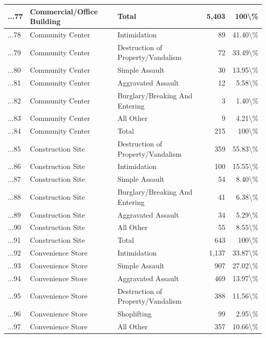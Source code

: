\documentclass[
]{krantz}
\begin{document}
\begin{longtable}[t]{l|l|l|r|r}
\hline
...77 & Commercial/Office Building & Total & 5,403 & 100\textbackslash{}\%\\
\hline
...78 & Community Center & Intimidation & 89 & 41.40\textbackslash{}\%\\
\hline
...79 & Community Center & Destruction of Property/Vandalism & 72 & 33.49\textbackslash{}\%\\
\hline
...80 & Community Center & Simple Assault & 30 & 13.95\textbackslash{}\%\\
\hline
...81 & Community Center & Aggravated Assault & 12 & 5.58\textbackslash{}\%\\
\hline
...82 & Community Center & Burglary/Breaking And Entering & 3 & 1.40\textbackslash{}\%\\
\hline
...83 & Community Center & All Other & 9 & 4.21\textbackslash{}\%\\
\hline
...84 & Community Center & Total & 215 & 100\textbackslash{}\%\\
\hline
...85 & Construction Site & Destruction of Property/Vandalism & 359 & 55.83\textbackslash{}\%\\
\hline
...86 & Construction Site & Intimidation & 100 & 15.55\textbackslash{}\%\\
\hline
...87 & Construction Site & Simple Assault & 54 & 8.40\textbackslash{}\%\\
\hline
...88 & Construction Site & Burglary/Breaking And Entering & 41 & 6.38\textbackslash{}\%\\
\hline
...89 & Construction Site & Aggravated Assault & 34 & 5.29\textbackslash{}\%\\
\hline
...90 & Construction Site & All Other & 55 & 8.55\textbackslash{}\%\\
\hline
...91 & Construction Site & Total & 643 & 100\textbackslash{}\%\\
\hline
...92 & Convenience Store & Intimidation & 1,137 & 33.87\textbackslash{}\%\\
\hline
...93 & Convenience Store & Simple Assault & 907 & 27.02\textbackslash{}\%\\
\hline
...94 & Convenience Store & Aggravated Assault & 469 & 13.97\textbackslash{}\%\\
\hline
...95 & Convenience Store & Destruction of Property/Vandalism & 388 & 11.56\textbackslash{}\%\\
\hline
...96 & Convenience Store & Shoplifting & 99 & 2.95\textbackslash{}\%\\
\hline
...97 & Convenience Store & All Other & 357 & 10.66\textbackslash{}\%\\

\end{longtable}
\end{document}
